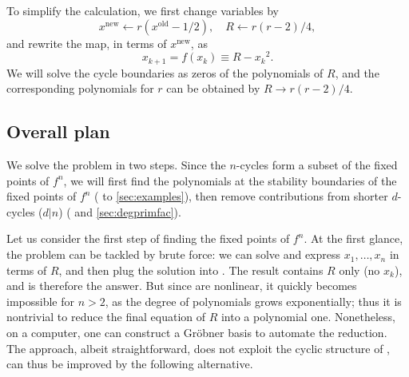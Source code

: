 \documentclass{ws-ijbc}
\begin{document}
To simplify the calculation, we first change variables \cite{saha} by
%
\[
    x^{\mathrm{new}} \leftarrow r(x^{\mathrm{old}} - 1/2),
    \quad R \leftarrow r(r-2)/4,
\]
%
and rewrite the map, in terms of $x^{\mathrm{new}}$, as
%
\begin{equation}
  x_{k+1} = f(x_k) \equiv R - {x_k}^2.
\label{eq:logmaps}
\end{equation}
%
%
We will solve the cycle boundaries as zeros of the polynomials of $R$,
and the corresponding polynomials for $r$ can be obtained by $R \rightarrow r(r-2)/4$.
%
%






\subsection{Overall plan}

We solve the problem in two steps.
Since the $n$-cycles form a subset of the fixed points of $f^n$,
we will first find
  the polynomials at the stability boundaries of
  the fixed points of $f^n$
  ( to \ref{sec:examples}),
then remove contributions from shorter $d$-cycles ($d|n$)
  ( and \ref{sec:degprimfac}).

Let us consider the first step of finding the fixed points of $f^n$.
At the first glance, the problem can be tackled by brute force:
  we can solve
   and express $x_1, \ldots, x_n$
  in terms of $R$,
  and then plug the solution into .
The result contains $R$ only (no $x_k$),
  and is therefore the answer.
But since  are nonlinear,
  it quickly becomes impossible for $n > 2$,
  as the degree of polynomials grows exponentially;
  thus it is nontrivial to reduce the final equation of $R$
  into a polynomial one.
Nonetheless, on a computer, one can
  construct a Gr\"obner basis \cite{kk1}
  to automate the reduction.
%
The approach, albeit straightforward, does not
  exploit the cyclic structure of ,
can thus be improved by the following alternative.
\end{document}
